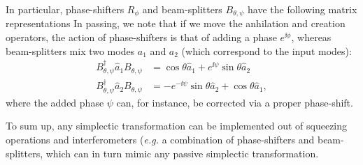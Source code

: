 In particular, phase-shifters $R_\phi$ and beam-splitters $B_{\theta,\psi}$
have the following matrix representations
In passing, we note that if we move the anhilation and creation operators, the action of phase-shifters is that of adding a phase $e^{\ii \phi}$, whereas beam-splitters mix two modes $a_1$ and $a_2$ (which correspond to the input modes):
\begin{align}\label{eq:colhonbs}
B_{\theta,\psi}^\dagger \hat{a}_1 B_{\theta,\psi} &= \cos\theta \hat{a}_1 + e^{\ii\psi}\sin\theta \hat{a}_2 \\
B_{\theta,\psi}^\dagger \hat{a}_2 B_{\theta,\psi} &=  -e^{-\ii\psi}\sin\theta \hat{a}_2 +\cos\theta \hat{a}_1,
\end{align}
where the added phase $\psi$ can, for instance, be corrected via a proper phase-shift.

To sum up, any simplectic transformation can be implemented out of squeezing operations and interferometers (\textit{e.g.} a combination of phase-shifters and beam-splitters, which can in turn mimic any passive simplectic transformation.%

